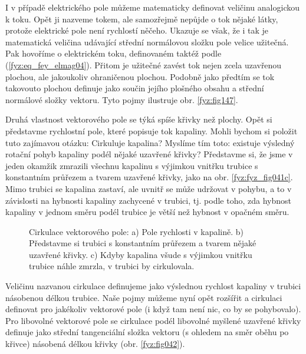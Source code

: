 
    I v případě elektrického pole můžeme matematicky definovat veličinu analogickou k toku. Opět ji
    nazveme tokem, ale samozřejmě nepůjde o tok nějaké látky, protože elektrické pole není rychlostí
    něčeho. Ukazuje se však, že i tak je matematická veličina udávající střední normálovou složku
    pole velice užitečná. Pak hovoříme o elektrickém toku, definovaném taktéž podle
    (\ref{fyz:eq_fey_elmag04}). Přitom je užitečné zavést tok nejen zcela uzavřenou plochou, ale
    jakoukoliv ohraničenou plochou. Podobně jako předtím se tok takovouto plochou definuje jako
    součin jejího plošného obsahu a střední normálové složky vektoru. Tyto pojmy ilustruje obr.
    \ref{fyz:fig147}. 
    
    Druhá vlastnost vektorového pole se týká spíše křivky než plochy. Opět si představme rychlostní 
    pole, které popisuje tok kapaliny. Mohli bychom si položit tuto zajímavou otázku: Cirkuluje 
    kapalina? Myslíme tím toto: existuje výsledný rotační pohyb kapaliny podél nějaké uzavřené 
    křivky? Představme si, že jsme v jeden okamžik zmrazili všechnu kapalinu s výjimkou vnitřku 
    trubice s konstantním průřezem a tvarem uzavřené křivky, jako na obr. \ref{fyz:fyz_fig041c}. 
    Mimo trubici se kapalina zastaví, ale uvnitř se může udržovat v pohybu, a to v závislosti na 
    hybnosti kapaliny zachycené v trubici, tj. podle toho, zda hybnost kapaliny v jednom směru 
    podél trubice je větší než hybnost v opačném směru.  

    \begin{figure}[ht!]
      \centering
        \newline
      \caption{Cirkulace vektorového pole: a) Pole rychlosti v kapalině. b) Představme si trubici s
               konstantním průřezem a tvarem nějaké uzavřené křivky. c) Kdyby kapalina všude s
               výjimkou vnitřku trubice náhle zmrzla, v trubici by cirkulovala.
               \cite[s.~18]{Feynman02}}
      \label{fyz:fig041}
    \end{figure}    

    Veličinu nazvanou cirkulace definujeme jako výslednou rychlost kapaliny v trubici násobenou 
    délkou trubice. Naše pojmy můžeme nyní opět rozšířit a cirkulaci definovat pro jakékoliv 
    vektorové pole (i když tam není nic, co by se pohybovalo). Pro libovolné vektorové pole se 
    cirkulace podél libovolné myšlené uzavřené křivky definuje jako střední tangenciální složka 
    vektoru (s ohledem na směr oběhu po křivce) násobená délkou křivky (obr. \ref{fyz:fig042}). 

